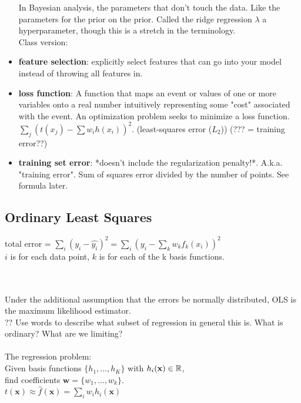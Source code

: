 \begin{itemize}
	In Bayesian analysis, the parameters that don't touch the data.  
	Like the parameters for the prior on the prior.  
	Called the ridge regression $\lambda$ a hyperparameter, though this is a stretch in the terminology.  \hfill \\
	Class version: 
	\item \textbf{feature selection}: explicitly select features that can go into your model instead of throwing all features in. 
	\item \textbf{loss function}:  
		 A function that maps an event or values of one or more variables onto a real number intuitively representing some 			"cost" associated with the event. 
		 An optimization problem seeks to minimize a loss function. \hfill \\
		$\sum_j (t(x_j) - \sum w_i h(x_i))^2$. (least-squares error ($L_2$))  (??? = training error??)
	\item \textbf{training set error}:  *doesn't include the regularization penalty!*.  A.k.a. "training error".  
			Sum of squares error divided by the number of points.   See formula later. 
\end{itemize}

\subsection{Ordinary Least Squares}
total error = $\displaystyle \sum_i (y_i-\hat{y_i})^2 = \sum_i(y_i - \sum_k w_k f_k(x_i))^2$ \hfill \\
$i$ is for each data point, $k$ is for each of the k basis functions. 

 \hfill \\ \hfill \\

Under the additional assumption that the errors be normally distributed, OLS is the maximum likelihood estimator. \hfill \\ %
?? Use words to describe what subset of regression in general this is.  What is ordinary? What are we limiting?  \hfill \\
 \hfill \\

The regression problem: \hfill \\
Given basis functions $\{ h_1, \dots, h_K \}$  with $h_i(\bf{x}) \in \mathbb{R}$,  \hfill \\
	find coefficients $\bm{w} = \{ w_1, \dots, w_k \}$.  \hfill \\%
$t(\bm{x}) \approx \widehat{f}(\bm{x}) = \sum_i w_i h_i(\bm{x})$     \hfill \\  \hfill \\


